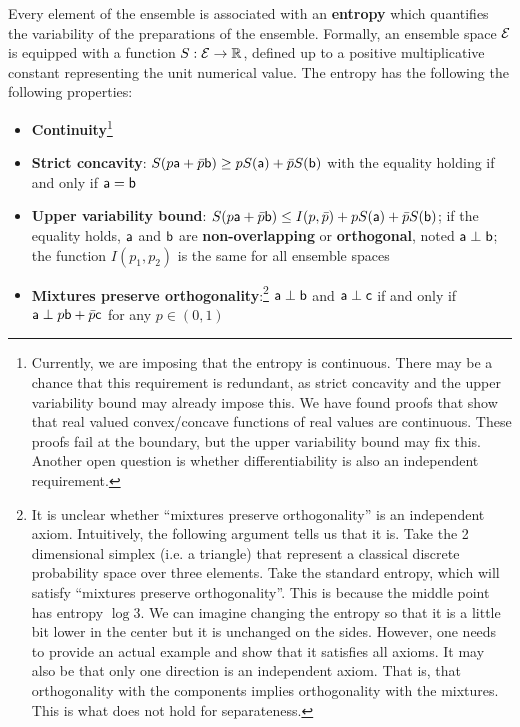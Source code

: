 \begin{axiom}
	Every element of the ensemble is associated with an \textbf{entropy} which quantifies the variability of the preparations of the ensemble. Formally, an ensemble space $\Ens$ is equipped with a function $S : \Ens \to \mathbb{R}$, defined up to a positive multiplicative constant representing the unit numerical value. The entropy has the following the following properties:
	\begin{itemize}
		\item \textbf{Continuity}\footnote{Currently, we are imposing that the entropy is continuous. There may be a chance that this requirement is redundant, as strict concavity and the upper variability bound may already impose this. We have found proofs that show that real valued convex/concave functions of real values are continuous. These proofs fail at the boundary, but the upper variability bound may fix this. Another open question is whether differentiability is also an independent requirement.}
		\item \textbf{Strict concavity}: $S(p\ens[a] + \bar{p} \ens[b]) \geq p S(\ens[a]) + \bar{p} S(\ens[b])$ with the equality holding if and only if $\ens[a] = \ens[b]$
		\item \textbf{Upper variability bound}: $S(p\ens[a] + \bar{p} \ens[b]) \leq I(p, \bar{p}) + p S(\ens[a]) + \bar{p} S(\ens[b])$; if the equality holds, $\ens[a]$ and $\ens[b]$ are \textbf{non-overlapping} or \textbf{orthogonal}, noted $\ens[a] \ortho \ens[b]$; the function $I(p_1, p_2)$ is the same for all ensemble spaces
		\item \textbf{Mixtures preserve orthogonality}:\footnote{It is unclear whether ``mixtures preserve orthogonality'' is an independent axiom. Intuitively, the following argument tells us that it is. Take the 2 dimensional simplex (i.e. a triangle) that represent a classical discrete probability space over three elements. Take the standard entropy, which will satisfy ``mixtures preserve orthogonality''. This is because the middle point has entropy $\log 3$. We can imagine changing the entropy so that it is a little bit lower in the center but it is unchanged on the sides. However, one needs to provide an actual example and show that it satisfies all axioms. It may also be that only one direction is an independent axiom. That is, that orthogonality with the components implies orthogonality with the mixtures. This is what does not hold for separateness.} $\ens[a] \ortho \ens[b]$ and $\ens[a] \ortho \ens[c]$ if and only if $\ens[a] \ortho p \ens[b] + \bar{p} \ens[c]$ for any $p \in (0,1)$
	\end{itemize}
\end{axiom}

